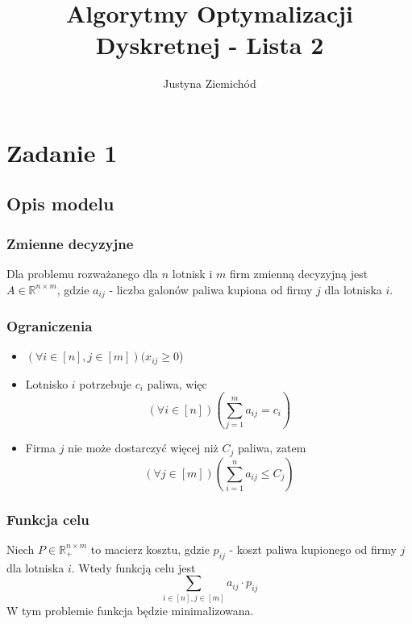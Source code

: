 \documentclass{article}
\title{Algorytmy Optymalizacji Dyskretnej - Lista 2}
\author{Justyna Ziemichód}
\begin{document}
\maketitle

\section{Zadanie 1}
\subsection{Opis modelu}
\subsubsection{Zmienne decyzyjne}
Dla problemu rozważanego dla \(n\) lotnisk i \(m\) firm zmienną decyzyjną jest \(A\in\mathbb{R}^{n \times m}\),
gdzie \(a_{ij}\) - liczba galonów paliwa kupiona od firmy \(j\) dla lotniska \(i\).

\subsubsection{Ograniczenia}
\begin{itemize}
    \item \((\forall i\in[n],j\in[m])(x_{ij} \geq 0\))
    \item Lotnisko \(i\) potrzebuje \(c_i\) paliwa, więc \[(\forall i \in [n])(\sum_{j=1}^m a_{ij} = c_i)\]
    \item Firma \(j\) nie może dostarczyć więcej niż \(C_j\) paliwa, zatem \[(\forall j \in [m])(\sum_{i=1}^n a_{ij} \leq C_j)\]
\end{itemize}

\subsubsection{Funkcja celu}
Niech \(P\in\mathbb{R}_+^{n \times m}\) to macierz kosztu, gdzie \(p_{ij}\) - koszt paliwa kupionego od firmy \(j\) dla lotniska \(i\). Wtedy funkcją celu jest \[\sum_{i\in[n],j\in[m]} a_{ij} \cdot p_{ij}\]
W tym problemie funkcja będzie minimalizowana.
\end{document}
